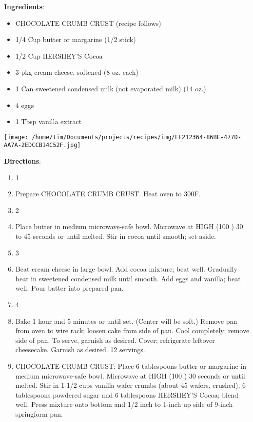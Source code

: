 \documentclass[11pt, twoside, openany]{book}
\begin{document}
\begin{minipage}[t]{0.8\linewidth}
\textbf{Ingredients}:\vspace{-3mm}
\begin{multicols}{2}
\begin{itemize}\setlength\itemsep{-1mm}
\item CHOCOLATE CRUMB CRUST (recipe follows)
\item 1/4 Cup butter or margarine (1/2 stick)
\item 1/2 Cup HERSHEY'S Cocoa
\item 3 pkg cream cheese, softened (8 oz. each)
\item 1 Can sweetened condensed milk (not evaporated milk) (14 oz.)
\item 4 eggs
\item 1 Tbsp vanilla extract
\end{itemize}
\end{multicols}
\end{minipage}
\begin{minipage}[t]{0.2\linewidth}
\centering \strut\vspace*{-\baselineskip}\newline
\texttt{[image: /home/tim/Documents/projects/recipes/img/FF212364-86BE-477D-AA7A-2EDCCB14C52F.jpg]}\\
\end{minipage}\vspace{3mm}
\textbf{Directions}:
\vspace{-3mm}\begin{enumerate}\setlength\itemsep{-1mm}
\item 1
\item Prepare CHOCOLATE CRUMB CRUST. Heat oven to 300F.
\item 2
\item Place butter in medium microwave-safe bowl. Microwave at HIGH (100 ) 30 to 45 seconds or until melted. Stir in cocoa until smooth; set aside.
\item 3
\item Beat cream cheese in large bowl. Add cocoa mixture; beat well. Gradually beat in sweetened condensed milk until smooth. Add eggs and vanilla; beat well. Pour batter into prepared pan.
\item 4
\item Bake 1 hour and 5 minutes or until set. (Center will be soft.) Remove pan from oven to wire rack; loosen cake from side of pan. Cool completely; remove side of pan. To serve, garnish as desired. Cover; refrigerate leftover cheesecake. Garnish as desired. 12 servings.
\item CHOCOLATE CRUMB CRUST: Place 6 tablespoons butter or margarine in medium microwave-safe bowl. Microwave at HIGH (100 ) 30 seconds or until melted. Stir in 1-1/2 cups vanilla wafer crumbs (about 45 wafers, crushed), 6 tablespoons powdered sugar and 6 tablespoons HERSHEY'S Cocoa; blend well. Press mixture onto bottom and 1/2 inch to 1-inch up side of 9-inch springform pan.
\end{enumerate}
\end{document}
